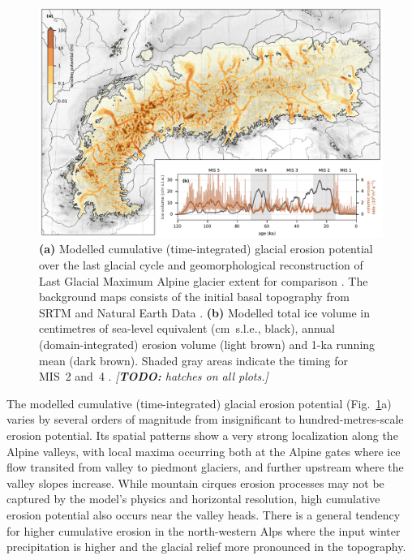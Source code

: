\documentclass[esurf, manuscript]{copernicus}
\newcommand{\todo}[1]{\textcolor{Rd}{\emph{[\textbf{TODO:} #1]}}}
\begin{document}
    \begin{figure}
      \centerline{\includegraphics{alpero_cumulative}}
      \caption{%
        \textbf{(a)} Modelled cumulative (time-integrated) glacial erosion
          potential over the last glacial cycle and geomorphological
          reconstruction of Last Glacial Maximum Alpine glacier extent for
          comparison \citep[solid red line,][]{Ehlers.etal.2011}.
          The background maps consists of the initial basal topography from
          SRTM \citep{Jarvis.etal.2008} and Natural Earth Data
          \citep{Patterson.Kelso.2017}.
        \textbf{(b)} Modelled total ice volume in centimetres of sea-level
          equivalent (cm~s.l.e., black), annual (domain-integrated) erosion
          volume (light brown) and 1-ka running mean (dark brown). Shaded gray
          areas indicate the timing for MIS~2 and~4
          \citep{Lisiecki.Raymo.2005}.
        \todo{hatches on all plots.}}
        \label{fig:cumulative}
    \end{figure}

    The modelled cumulative (time-integrated) glacial erosion potential
    (Fig.~\ref{fig:cumulative}a) varies by several orders of magnitude
    from insignificant to hundred-metres-scale erosion potential. Its spatial
    patterns show a very strong localization along the Alpine valleys, with
    local maxima occurring both at
    the Alpine gates where ice flow transited from valley to piedmont glaciers,
    and further upstream where the valley slopes increase. While mountain
    cirques erosion processes may not be captured by the model's physics
    \citep[cf.][]{Sanders.etal.2012} and horizontal resolution, high
    cumulative erosion potential also occurs near the valley heads.
    There is a general tendency for higher cumulative erosion in the
    north-western Alps where the input winter precipitation is higher
    \citep[WorldClim, Fig.~1h in][]{Seguinot.etal.2018} and the glacial relief
    more pronounced in the topography.
\end{document}
